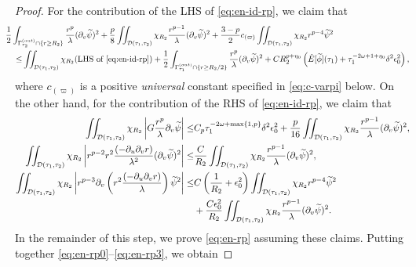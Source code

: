 \documentclass[10pt, reqno]{amsart}
\theoremstyle{definition}
\theoremstyle{remark}
\theoremstyle{conjecture}
\numberwithin{equation}{section}
\newcommand{\abs}[1]{\vert#1\vert}
\newcommand{\set}[1]{\{#1\}}
\newcommand{\rd}{\partial}
\newcommand{\0}{\emptyset}
\newcommand{\Gmm}{\Gamma}
\newcommand{\dlt}{\delta}
\newcommand{\eps}{\epsilon}
\newcommand{\lmb}{\lambda}
\newcommand{\omg}{\omega}
\newcommand{\calD}{\mathcal D}
\newcommand{\dvr}{\lmb}
\newcommand{\phibg}{\overline{\phi}}				%
\newcommand{\psibg}{\overline{\psi}}				%
\newcommand{\phidf}{\widetilde{\phi}}				%
\newcommand{\psidf}{\widetilde{\psi}}				%
\newcommand{\Abs}[1]{\left\vert #1 \right\vert}
\begin{document}
\begin{proof}
For the contribution of the LHS of \eqref{eq:en-id-rp}, we claim that
\begin{equation} \label{eq:en-rp0}
\begin{aligned}
& \hskip-2em
	\frac{1}{2} \int_{\Gmm^{(out)}_{\tau_{2}} \cap \set{r \geq R_{2}}} \frac{r^{p}}{\dvr} (\rd_{v} \psidf)^{2} 
	+ \frac{p}{8} \iint_{\calD(\tau_{1}, \tau_{2})} \chi_{R_{2}} \frac{r^{p-1}}{\dvr} (\rd_{v} \psidf)^{2} 
	+ \frac{3-p}{2} c_{(\varpi)} \iint_{\calD(\tau_{1}, \tau_{2})} \chi_{R_{2}} r^{p-4} \psidf ^{2} \\
\leq & \iint_{\calD(\tau_{1}, \tau_{2})} \chi_{R_{2}} (\hbox{LHS of \eqref{eq:en-id-rp}})  
	+  \frac{1}{2} \int_{\Gmm^{(out)}_{\tau_{1}} \cap \set{r \geq R_{2}/2}} \frac{r^{p}}{\dvr} (\rd_{v} \psidf)^{2} + C R_{2}^{p+\eta_{0}} \left( \dot{E}[\phidf](\tau_{1}) + \tau_{1}^{-2 \omg + 1 + \eta_{0}} \dlt^{2} \eps_{0}^{2}\right),
\end{aligned}
\end{equation}
where $c_{(\varpi)}$ is a positive \emph{universal} constant specified in \eqref{eq:c-varpi} below. On the other hand, for the contribution of the RHS of \eqref{eq:en-id-rp}, we claim that
\begin{align} 
	\iint_{\calD(\tau_{1}, \tau_{2})} \chi_{R_{2}} \Abs{G \frac{r^{p}}{\dvr} \rd_{v} \psidf} 
\leq & C_{p} \tau_{1}^{-2 \omg + \max \set{1, p}} \dlt^{2} \eps_{0}^{2}
	+ \frac{p}{16} \iint_{\calD(\tau_{1}, \tau_{2})} \chi_{R_{2}} \frac{r^{p-1}}{\dvr} (\rd_{v} \psidf)^{2} , \label{eq:en-rp1} \\
	\iint_{\calD(\tau_{1}, \tau_{2})} \chi_{R_{2}} \Abs{r^{p-2} r^{2} \frac{(- \rd_{u} \rd_{v} r)}{\dvr^{2}} (\rd_{v} \psidf)^{2} }
	\leq & \frac{C}{R_{2}} \iint_{\calD(\tau_{1}, \tau_{2})} \chi_{R_{2}} \frac{r^{p-1}}{\dvr} (\rd_{v} \psidf)^{2} , \label{eq:en-rp2}  \\
	\iint_{\calD(\tau_{1}, \tau_{2})} \chi_{R_{2}} \Abs{r^{p-3} \rd_{v} \left( r^{2} \frac{(- \rd_{u} \rd_{v} r)}{\dvr} \right) \psidf^{2} }
	\leq & C \left(\frac{1}{R_{2}} + \eps_{0}^{2} \right) \iint_{\calD(\tau_{1}, \tau_{2})} \chi_{R_{2}} r^{p-4} \psidf^{2} \notag \\
	& + \frac{C \eps_{0}^{2}}{R_{2}} \iint_{\calD(\tau_{1}, \tau_{2})} \chi_{R_{2}} \frac{r^{p-1}}{\dvr} (\rd_{v} \psidf)^{2} . \label{eq:en-rp3} 
\end{align}
In the remainder of this step, we prove \eqref{eq:en-rp} assuming these claims. Putting together \eqref{eq:en-rp0}--\eqref{eq:en-rp3}, we obtain

\end{proof}
\end{document}
